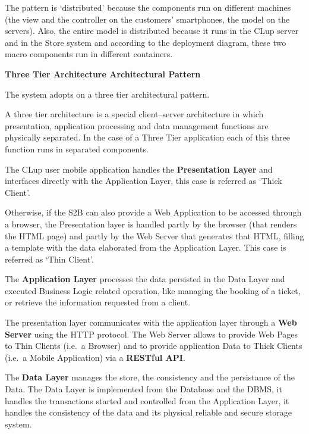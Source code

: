 The pattern is `distributed' because the components run on different machines (the view and the controller on the customers' smartphones, the model on the servers). Also, the entire model is distributed because it runs in the CLup server and in the Store system and according to the deployment diagram, these two macro components run in different containers.

\medskip

\textbf{Three Tier Architecture Architectural Pattern}

\medskip

The system adopts on a three tier architectural pattern.

A three tier architecture is a special client–server architecture in which presentation, application processing and data management functions are physically separated. In the case of a Three Tier application each of this three function runs in separated components.

The CLup user mobile application handles the \textbf{Presentation Layer} and interfaces directly with the Application Layer, this case is referred as `Thick Client'.

Otherwise, if the S2B can also provide a Web Application to be accessed through a browser, the Presentation layer is handled partly by the browser (that renders the HTML page) and partly by the Web Server that generates that HTML, filling a template with the data elaborated from the Application Layer. This case is referred as `Thin Client'.

The \textbf{Application Layer} processes the data persisted in the Data Layer and executed Business Logic related operation, like managing the booking of a ticket, or retrieve the information requested from a client.

The presentation layer communicates with the application layer through a \textbf{Web Server} using the HTTP protocol. The Web Server allows to provide Web Pages to Thin Clients (i.e.~a Browser) and to provide application Data to Thick Clients (i.e.~a Mobile Application) via a \textbf{RESTful API}.

The \textbf{Data Layer} manages the store, the consistency and the persistance of the Data. The Data Layer is implemented from the Database and the DBMS, it handles the transactions started and controlled from the Application Layer, it handles the consistency of the data and its physical reliable and secure storage system.

